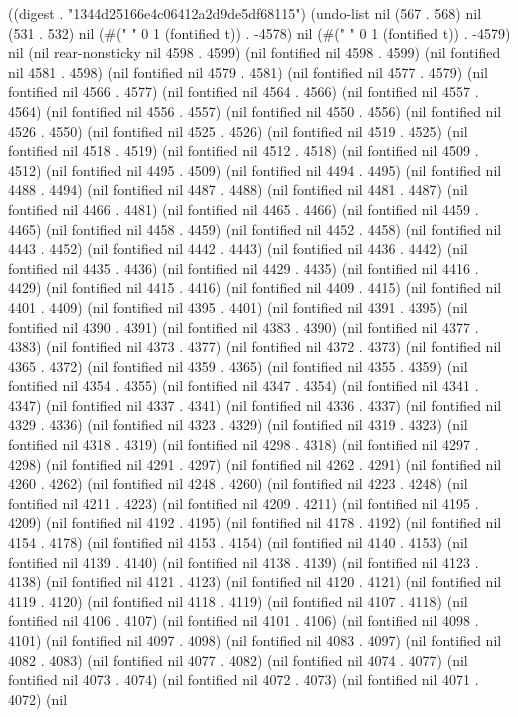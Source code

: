 
((digest . "1344d25166e4c06412a2d9de5df68115") (undo-list nil (567 . 568) nil (531 . 532) nil (#("%
" 0 1 (fontified t)) . -4578) nil (#(" " 0 1 (fontified t)) . -4579) nil (nil rear-nonsticky nil 4598 . 4599) (nil fontified nil 4598 . 4599) (nil fontified nil 4581 . 4598) (nil fontified nil 4579 . 4581) (nil fontified nil 4577 . 4579) (nil fontified nil 4566 . 4577) (nil fontified nil 4564 . 4566) (nil fontified nil 4557 . 4564) (nil fontified nil 4556 . 4557) (nil fontified nil 4550 . 4556) (nil fontified nil 4526 . 4550) (nil fontified nil 4525 . 4526) (nil fontified nil 4519 . 4525) (nil fontified nil 4518 . 4519) (nil fontified nil 4512 . 4518) (nil fontified nil 4509 . 4512) (nil fontified nil 4495 . 4509) (nil fontified nil 4494 . 4495) (nil fontified nil 4488 . 4494) (nil fontified nil 4487 . 4488) (nil fontified nil 4481 . 4487) (nil fontified nil 4466 . 4481) (nil fontified nil 4465 . 4466) (nil fontified nil 4459 . 4465) (nil fontified nil 4458 . 4459) (nil fontified nil 4452 . 4458) (nil fontified nil 4443 . 4452) (nil fontified nil 4442 . 4443) (nil fontified nil 4436 . 4442) (nil fontified nil 4435 . 4436) (nil fontified nil 4429 . 4435) (nil fontified nil 4416 . 4429) (nil fontified nil 4415 . 4416) (nil fontified nil 4409 . 4415) (nil fontified nil 4401 . 4409) (nil fontified nil 4395 . 4401) (nil fontified nil 4391 . 4395) (nil fontified nil 4390 . 4391) (nil fontified nil 4383 . 4390) (nil fontified nil 4377 . 4383) (nil fontified nil 4373 . 4377) (nil fontified nil 4372 . 4373) (nil fontified nil 4365 . 4372) (nil fontified nil 4359 . 4365) (nil fontified nil 4355 . 4359) (nil fontified nil 4354 . 4355) (nil fontified nil 4347 . 4354) (nil fontified nil 4341 . 4347) (nil fontified nil 4337 . 4341) (nil fontified nil 4336 . 4337) (nil fontified nil 4329 . 4336) (nil fontified nil 4323 . 4329) (nil fontified nil 4319 . 4323) (nil fontified nil 4318 . 4319) (nil fontified nil 4298 . 4318) (nil fontified nil 4297 . 4298) (nil fontified nil 4291 . 4297) (nil fontified nil 4262 . 4291) (nil fontified nil 4260 . 4262) (nil fontified nil 4248 . 4260) (nil fontified nil 4223 . 4248) (nil fontified nil 4211 . 4223) (nil fontified nil 4209 . 4211) (nil fontified nil 4195 . 4209) (nil fontified nil 4192 . 4195) (nil fontified nil 4178 . 4192) (nil fontified nil 4154 . 4178) (nil fontified nil 4153 . 4154) (nil fontified nil 4140 . 4153) (nil fontified nil 4139 . 4140) (nil fontified nil 4138 . 4139) (nil fontified nil 4123 . 4138) (nil fontified nil 4121 . 4123) (nil fontified nil 4120 . 4121) (nil fontified nil 4119 . 4120) (nil fontified nil 4118 . 4119) (nil fontified nil 4107 . 4118) (nil fontified nil 4106 . 4107) (nil fontified nil 4101 . 4106) (nil fontified nil 4098 . 4101) (nil fontified nil 4097 . 4098) (nil fontified nil 4083 . 4097) (nil fontified nil 4082 . 4083) (nil fontified nil 4077 . 4082) (nil fontified nil 4074 . 4077) (nil fontified nil 4073 . 4074) (nil fontified nil 4072 . 4073) (nil fontified nil 4071 . 4072) (nil 